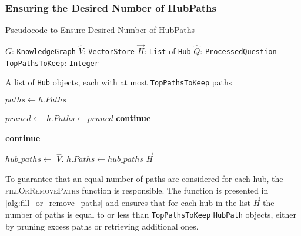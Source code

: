 \subsubsection{Ensuring the Desired Number of HubPaths}

\begin{algorithm}[t]
\caption{Pseudocode to Ensure Desired Number of HubPaths}
\label{alg:fill_or_remove_paths}
\begin{algorithmic}[1]
\PersistentState
    \Statex $G$: \texttt{KnowledgeGraph} 
    \Statex $\hat{V}$: \texttt{VectorStore} 
\Require 
    \Statex $\vec{H}$: \texttt{List} of \texttt{Hub} 
    \Statex $\hat{Q}$: \texttt{ProcessedQuestion} 
    \Statex \texttt{TopPathsToKeep}: \texttt{Integer} 
    
\Ensure
    \Statex A list of \texttt{Hub} objects, each with at most \texttt{TopPathsToKeep} paths

\Statex
{}
        \State $paths \gets h.Paths$ 

            \State $pruned \gets$ 
            \State $h.Paths \gets pruned$
            \State \textbf{continue}
        \EndIf

            \State \textbf{continue} 
        \EndIf

        \State $hub\_paths \gets$ $\hat{V}$.
        \State $h.Paths \gets hub\_paths$ 
    \EndFor
    \State \Return $\vec{H}$
\EndFunction
\end{algorithmic}
\end{algorithm}

To guarantee that an equal number of paths are considered for each hub, the \textsc{fillOrRemovePaths} function is responsible. The function is presented in \autoref{alg:fill_or_remove_paths} and ensures that for each hub in the list \(\vec{H}\) the number of paths is equal to or less than \texttt{TopPathsToKeep} \texttt{HubPath} objects, either by pruning excess paths or retrieving additional ones. 

